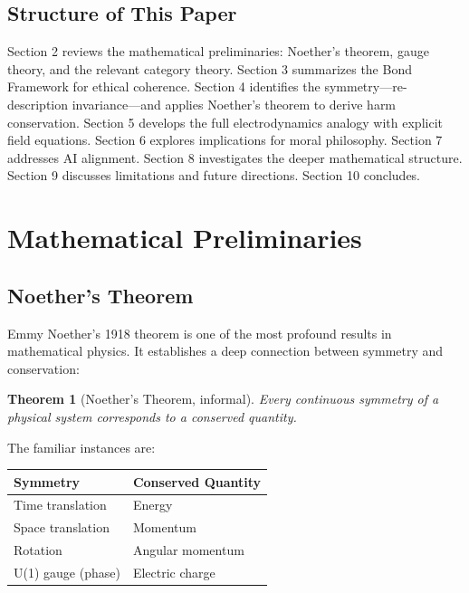 \documentclass[12pt,letterpaper]{article}
\newtheorem{theorem}{Theorem}[section]
\theoremstyle{definition}
\theoremstyle{remark}
\begin{document}
\subsection{Structure of This Paper}

Section 2 reviews the mathematical preliminaries: Noether's theorem, gauge theory, and the relevant category theory. Section 3 summarizes the Bond Framework for ethical coherence. Section 4 identifies the symmetry---re-description invariance---and applies Noether's theorem to derive harm conservation. Section 5 develops the full electrodynamics analogy with explicit field equations. Section 6 explores implications for moral philosophy. Section 7 addresses AI alignment. Section 8 investigates the deeper mathematical structure. Section 9 discusses limitations and future directions. Section 10 concludes.

\section{Mathematical Preliminaries}

\subsection{Noether's Theorem}

Emmy Noether's 1918 theorem is one of the most profound results in mathematical physics. It establishes a deep connection between symmetry and conservation:

\begin{theorem}[Noether's Theorem, informal]
Every continuous symmetry of a physical system corresponds to a conserved quantity.
\end{theorem}

The familiar instances are:

\begin{center}
\begin{tabular}{ll}
\toprule
\textbf{Symmetry} & \textbf{Conserved Quantity} \\
\midrule
Time translation & Energy \\
Space translation & Momentum \\
Rotation & Angular momentum \\
U(1) gauge (phase) & Electric charge \\
\bottomrule
\end{tabular}
\end{center}
\end{document}
